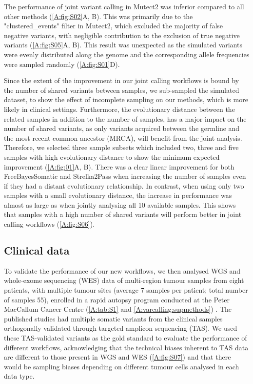 The performance of joint variant calling in Mutect2 was inferior compared to all other methods (\autoref{A:fig:S02}A, B). This was primarily due to the "clustered\_events" filter in Mutect2, which excluded the majority of false negative variants, with negligible contribution to the exclusion of true negative variants (\autoref{A:fig:S05}A, B). This result was unexpected as the simulated variants were evenly distributed along the genome and the corresponding allele frequencies were sampled randomly (\autoref{A:fig:S01}D).

Since the extent of the improvement in our joint calling workflows is bound by the number of shared variants between samples, we sub-sampled the simulated dataset, to show the effect of incomplete sampling on our methods, which is more likely in clinical settings. Furthermore, the evolutionary distance between the related samples in addition to the number of samples, has a major impact on the number of shared variants, as only variants acquired between the germline and the most recent common ancestor (MRCA), will benefit from the joint analysis. Therefore, we selected three sample subsets which included two, three and five samples with high evolutionary distance to show the minimum expected improvement (\autoref{A:fig:01}A, B). There was a clear linear improvement for both FreeBayesSomatic and Strelka2Pass when increasing the number of samples even if they had a distant evolutionary relationship. In contrast, when using only two samples with a small evolutionary distance, the increase in performance was almost as large as when jointly analysing all 10 available samples. This shows that samples with a high number of shared variants will perform better in joint calling workflows (\autoref{A:fig:S06}).

\subsection{Clinical data}
To validate the performance of our new workflows, we then analysed WGS and whole-exome sequencing (WES) data of multi-region tumour samples from eight patients, with multiple tumour sites (average 7 samples per patient; total number of samples 55), enrolled in a rapid autopsy program conducted at the Peter MacCallum Cancer Centre (\autoref{A:tab:S1} and \autoref{A:varcalling:supmethods}) \parencite{Solomon2020, Vergara2021}. The published studies had multiple somatic variants from the clinical samples orthogonally validated through targeted amplicon sequencing (TAS). We used these TAS-validated variants as the gold standard to evaluate the performance of different workflows, acknowledging that the technical biases inherent to TAS data are different to those present in WGS and WES (\autoref{A:fig:S07}) and that there would be sampling biases depending on different tumour cells analysed in each data type.

